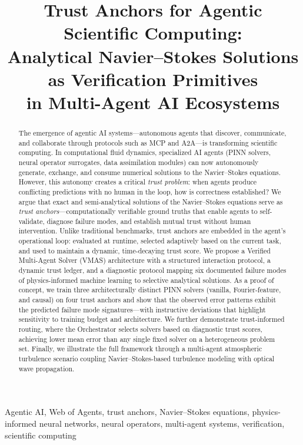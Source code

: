 \documentclass[conference]{IEEEtran}
\title{Trust Anchors for Agentic Scientific Computing:\\
Analytical Navier--Stokes Solutions as Verification Primitives\\in Multi-Agent AI Ecosystems}
\author{
\IEEEauthorblockN{Tatiana Petrova}
\IEEEauthorblockA{SEDAN -- SnT\\
University of Luxembourg\\
tatiana.petrova@uni.lu}
}
\begin{document}
\maketitle

\begin{abstract}
The emergence of agentic AI systems---autonomous agents that discover, communicate, and collaborate through protocols such as MCP and A2A---is transforming scientific computing. In computational fluid dynamics, specialized AI agents (PINN solvers, neural operator surrogates, data assimilation modules) can now autonomously generate, exchange, and consume numerical solutions to the Navier--Stokes equations. However, this autonomy creates a critical \emph{trust problem}: when agents produce conflicting predictions with no human in the loop, how is correctness established? We argue that exact and semi-analytical solutions of the Navier--Stokes equations serve as \emph{trust anchors}---computationally verifiable ground truths that enable agents to self-validate, diagnose failure modes, and establish mutual trust without human intervention. Unlike traditional benchmarks, trust anchors are embedded in the agent's operational loop: evaluated at runtime, selected adaptively based on the current task, and used to maintain a dynamic, time-decaying trust score. We propose a Verified Multi-Agent Solver (VMAS) architecture with a structured interaction protocol, a dynamic trust ledger, and a diagnostic protocol mapping six documented failure modes of physics-informed machine learning to selective analytical solutions. As a proof of concept, we train three architecturally distinct PINN solvers (vanilla, Fourier-feature, and causal) on four trust anchors and show that the observed error patterns exhibit the predicted failure mode signatures---with instructive deviations that highlight sensitivity to training budget and architecture. We further demonstrate trust-informed routing, where the Orchestrator selects solvers based on diagnostic trust scores, achieving lower mean error than any single fixed solver on a heterogeneous problem set. Finally, we illustrate the full framework through a multi-agent atmospheric turbulence scenario coupling Navier--Stokes-based turbulence modeling with optical wave propagation.
\end{abstract}

\begin{IEEEkeywords}
Agentic AI, Web of Agents, trust anchors, Navier--Stokes equations, physics-informed neural networks, neural operators, multi-agent systems, verification, scientific computing
\end{IEEEkeywords}
\end{document}
